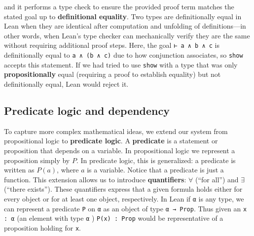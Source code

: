 \begin{example}
  and it performs a type check to ensure the provided proof term matches the stated
  goal up to \textbf{definitional equality}.
  Two types are definitionally equal in Lean when they are identical after computation
  and unfolding of definitions—in other words, when Lean's type checker
  can mechanically verify they are the same without requiring additional proof steps.
  Here, the goal \lstinline[language=lean]|⊢ a ∧ b ∧ c| is definitionally
  equal to \lstinline[language=lean]|a ∧ (b ∧ c)| due to how conjunction
  associates, so \lstinline[language=lean]|show| accepts this statement.
  If we had tried to use \lstinline[language=lean]|show| with a type that
  was only \textbf{propositionally} equal (requiring a proof to establish equality)
  but not definitionally equal, Lean would reject it.
\end{example}
\subsection{Predicate logic and dependency}
To capture more complex mathematical ideas, we extend our system from
propositional logic to \textbf{predicate logic}.
A \textbf{predicate} is a statement or proposition that depends on a variable.
In propositional logic we represent a proposition simply by $P$.
In predicate logic, this is generalized: a predicate is written as $P(a)$,
where $a$ is a variable. Notice that a predicate is just a function.
This extension allows us to introduce \textbf{quantifiers}:
$\forall$ (``for all'') and $\exists$ (``there exists'').
These quantifiers express that a given formula holds either for every object
or for at least one object, respectively.
In Lean if \lstinline[language=lean]|α| is any type, we can represent a
predicate \lstinline[language=lean]|P| on \lstinline[language=lean]|α| as
an object of type \lstinline[language=lean]|α → Prop|.
Thus given an \lstinline[language=lean]|x : α| (an element
with type \lstinline[language=lean]|α| )
\lstinline[language=lean]|P(x) : Prop| would be representative of a proposition
holding for \lstinline[language=lean]|x|.

